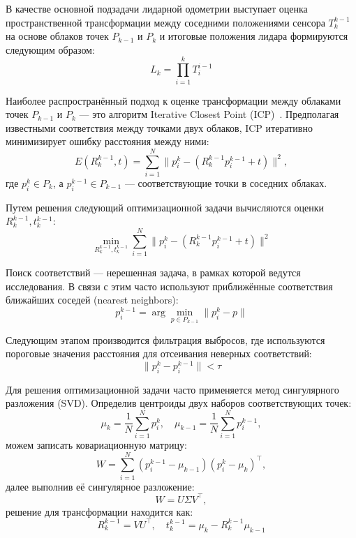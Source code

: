 В качестве основной подзадачи лидарной одометрии выступает оценка пространственной 
трансформации между соседними положениями сенсора $T_k^{k-1}$ на основе облаков 
точек ${P}_{k-1}$ и ${P}_k$ и итоговые положения лидара формируются
следующим образом:
\begin{equation}
    L_k = \prod_{i=1}^{k} T_i^{i-1}
\end{equation}

Наиболее распространённый подход к оценке трансформации между облаками точек 
${P}_{k-1}$ и ${P}_k$ --- это алгоритм Iterative Closest Point (ICP)~\cite{4767965}.
Предполагая известными соответствия между точками двух облаков, 
ICP итеративно минимизирует ошибку расстояния между ними:
\begin{equation}
    E(R^{k-1}_k ,t) = \sum_{i=1}^{N}\|p_i^k - (R^{k-1}_k p_i^{k-1}+t)\|^2,
\end{equation}
где $p_i^k \in {P}_k$, а $p_i^{k-1} \in {P}_{k-1}$ --- соответствующие точки в соседних облаках.

Путем решения следующий оптимизационной задачи вычисляются оценки $R^{k-1}_k ,t^{k-1}_k$:
\begin{equation}
    \min_{R^{k-1}_k ,t^{k-1}_k}\sum_{i=1}^{N}\|p_i^k - (R^{k-1}_k p_i^{k-1}+t)\|^2
\end{equation}

Поиск соответствий --- нерешенная задача, в рамках которой ведутся исследования. 
В связи с этим часто используют приближённые соответствия ближайших соседей (nearest neighbors):
\begin{equation}
    p_i^{k-1} = \arg\min_{p \in {P}_{k-1}} \|p_i^k - p\|
\end{equation}

Следующим этапом производится фильтрация выбросов, где используются пороговые 
значения расстояния для отсеивания неверных соответствий:
\begin{equation}
    \|p_i^k - p_i^{k-1}\| < \tau
\end{equation}

Для решения оптимизационной задачи часто применяется метод сингулярного разложения (SVD). 
Определив центроиды двух наборов соответствующих точек:
\begin{equation}
    \mu_k = \frac{1}{N}\sum_{i=1}^{N}p_i^k, \quad \mu_{k-1} = \frac{1}{N}\sum_{i=1}^{N}p_i^{k-1},
\end{equation}
можем записать ковариационную матрицу:
\begin{equation}
    W = \sum_{i=1}^{N}(p_i^{k-1}-\mu_{k-1})(p_i^k-\mu_k)^\top,
\end{equation}
далее выполнив её сингулярное разложение:
\begin{equation}
    W = U\Sigma V^\top,
\end{equation}
решение для трансформации находится как:
\begin{equation}
    R^{k-1}_k = VU^\top, \quad t^{k-1}_k = \mu_k - R^{k-1}_k\mu_{k-1}
\end{equation}

